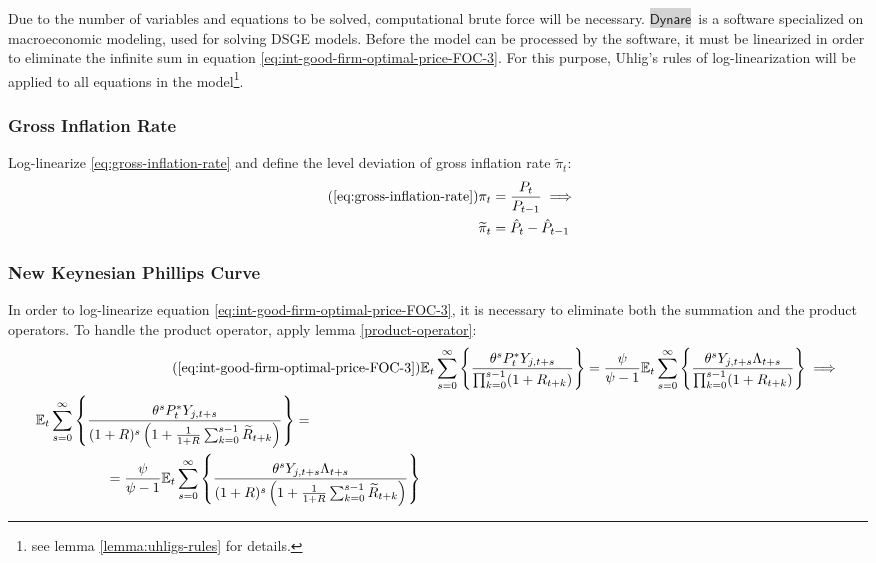 \documentclass[
	12pt, 
	]{article}
\numberwithin{equation}{section}
\newcommand{\E}[1][t]{{\mathbb{E}_{#1}}}
\newcommand{\dynare}{\colorbox{lightgray}{$\mathsf{Dynare}$}}
\theoremstyle{definition}
\theoremstyle{plain}
\theoremstyle{plain}
\theoremstyle{plain}
\begin{document}
Due to the number of variables and equations to be solved, computational brute force will be necessary. \dynare \ is a software specialized on macroeconomic modeling, used for solving DSGE models. Before the model can be processed by the software, it must be linearized in order to eliminate the infinite sum in equation \ref{eq:int-good-firm-optimal-price-FOC-3}. For this purpose, Uhlig's rules of log-linearization \cite{uhlig_toolkit_1999} will be applied to all equations in the model\footnote{see lemma \ref{lemma:uhligs-rules} for details.}.


\subsubsection{Gross Inflation Rate}

Log-linearize \ref{eq:gross-inflation-rate} and define the level deviation of gross inflation rate $\widetilde{\pi}_t$:
\begin{align}
	\tag{\ref{eq:gross-inflation-rate}}
	\pi_t &= \frac{P_t}{P_{t-1}} \implies \\
	\widetilde{\pi}_t &= \hat{P}_t - \hat{P}_{t-1}
	\label{eq:level-dev-gross-inflation-rate}
\end{align}


\subsubsection{New Keynesian Phillips Curve}

In order to log-linearize equation \ref{eq:int-good-firm-optimal-price-FOC-3}, it is necessary to eliminate both the summation and the product operators. To handle the product operator, apply lemma \ref{product-operator}:
\begin{align}
\tag{\ref{eq:int-good-firm-optimal-price-FOC-3}}
	& \E \sum_{s=0}^{\infty} \left\{ \frac{\theta^s P_t^\ast Y_{j,t+s} }{ \prod_{k=0}^{s-1}(1+R_{t+k})} \right\} = \frac{\psi}{\psi-1} \E \sum_{s=0}^{\infty} \left\{ \frac{\theta^s Y_{j,t+s} \Lambda_{t+s}}{\prod_{k=0}^{s-1}(1+R_{t+k})} \right\} \implies
\\
	\begin{split}
		& \E \sum_{s=0}^{\infty} \left\{ \frac{\theta^s P_t^\ast Y_{j,t+s}}{ (1 + R)^s \left( 1 + \frac{1}{1 + R} \sum_{k=0}^{s-1} \widetilde{R}_{t+k} \right) } \right\} = 
	\\ & \quad \quad \quad \quad \quad = \frac{\psi}{\psi-1} \E \sum_{s=0}^{\infty} \left\{ \frac{\theta^s Y_{j,t+s} \Lambda_{t+s}}{ (1 + R)^s \left( 1 + \frac{1}{1 + R} \sum_{k=0}^{s-1} \widetilde{R}_{t+k} \right) } \right\} \label{eq:ll-optimal-price}
	\end{split}
\end{align}
\end{document}
